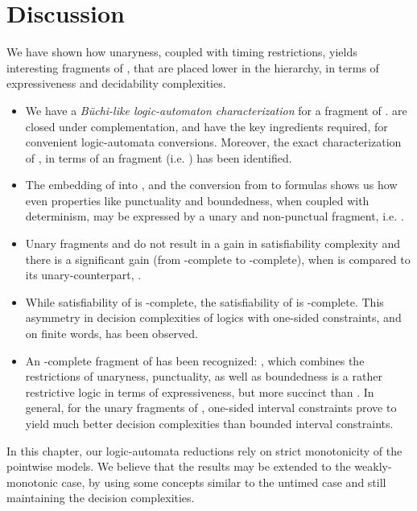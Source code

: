 \documentclass{llncs}
\newcommand{\mitlus}{\mbox{}}
\newcommand{\bmitlfp}{\mbox{}}
\newcommand{\potdta}{\mbox{}}
\newcommand{\mitlfpinf}{\mbox{}}
\newcommand{\mitlusinf}{\mbox{}}
\newcommand{\mitlfpb}{\bmitlfp}
\newcommand{\mitl}{\mbox{}}
\newcommand{\mtl}{\mbox{}}
\newcommand{\mitluszinf}{\mbox{}}
\newcommand{\mitlfz}{\mbox{}}
\newcommand{\pspace}{\mbox{}}
\newcommand{\nexptime}{\mbox{}}
\newcommand{\np}{\mbox{}}
\begin{document}
\section{Discussion}
We have shown how unaryness, coupled with timing restrictions, yields interesting fragments of \mitl, that are placed lower in the hierarchy, in terms of expressiveness and decidability complexities.
\begin{itemize}
\item We have a \emph{B\"uchi-like logic-automaton characterization} for a fragment of \mtl. \potdta\/ are closed under complementation, and have the key ingredients required, for convenient logic-automata conversions. Moreover, the exact characterization of \potdta, in terms of an \mtl\/ fragment (i.e. \mitlfpinf) has been identified.
\item The embedding of \mitlfpb\/ into \potdta, and the conversion from \potdta\/ to \mitlfpinf\/ formulas shows us how even properties like punctuality and boundedness, when coupled with determinism, may be expressed by a unary and non-punctual fragment, i.e. \mitlfpinf.
\item Unary fragments \mitlus\/ and \mitluszinf\/ do not result in a gain in satisfiability complexity and there is a significant gain (from \pspace-complete to \np-complete), when \mitlusinf\/ is compared to its unary-counterpart, \mitlfpinf.
\item While satisfiability of \mitlfz\/ is \pspace-complete, the satisfiability of \mitlfpinf\/ is \np-complete. This asymmetry in decision complexities of logics with one-sided constraints, and on finite words, has been observed.
\item An \nexptime-complete fragment of \mitl\/ has been recognized: \mitlfpb, which combines the restrictions of unaryness, punctuality, as well as boundedness is a rather restrictive logic in terms of expressiveness, but more succinct than \mitlfpinf.  In general, for the unary fragments of \mitl, one-sided interval constraints prove to yield much better decision complexities than bounded interval constraints.
\end{itemize}

In this chapter, our logic-automata reductions rely on strict monotonicity of the pointwise models. We believe that the results may be extended to the weakly-monotonic case, by using some concepts similar to the untimed case and still maintaining the decision complexities. 



\end{document}
